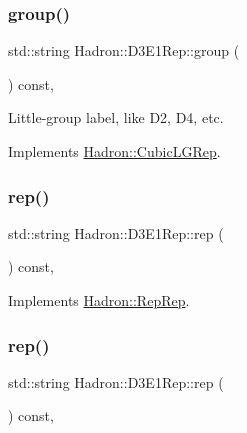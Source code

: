 \subsubsection{\texorpdfstring{group()}{group()}\hspace{0.1cm}{\footnotesize\ttfamily [3/3]}}
{\footnotesize\ttfamily std\+::string Hadron\+::\+D3\+E1\+Rep\+::group (\begin{DoxyParamCaption}{ }\end{DoxyParamCaption}) const\hspace{0.3cm}{\ttfamily [inline]}, {\ttfamily [virtual]}}

Little-\/group label, like D2, D4, etc. 

Implements \mbox{\hyperlink{structHadron_1_1CubicLGRep_a9bdb14b519a611d21379ed96a3a9eb41}{Hadron\+::\+Cubic\+L\+G\+Rep}}.

\mbox{\label{structHadron_1_1D3E1Rep_a31b989d15d93cd4e876bfabd809b84ee}} 
\subsubsection{\texorpdfstring{rep()}{rep()}\hspace{0.1cm}{\footnotesize\ttfamily [1/3]}}
{\footnotesize\ttfamily std\+::string Hadron\+::\+D3\+E1\+Rep\+::rep (\begin{DoxyParamCaption}{ }\end{DoxyParamCaption}) const\hspace{0.3cm}{\ttfamily [inline]}, {\ttfamily [virtual]}}



Implements \mbox{\hyperlink{structHadron_1_1RepRep_ab3213025f6de249f7095892109575fde}{Hadron\+::\+Rep\+Rep}}.

\mbox{\label{structHadron_1_1D3E1Rep_a31b989d15d93cd4e876bfabd809b84ee}} 
\subsubsection{\texorpdfstring{rep()}{rep()}\hspace{0.1cm}{\footnotesize\ttfamily [2/3]}}
{\footnotesize\ttfamily std\+::string Hadron\+::\+D3\+E1\+Rep\+::rep (\begin{DoxyParamCaption}{ }\end{DoxyParamCaption}) const\hspace{0.3cm}{\ttfamily [inline]}, {\ttfamily [virtual]}}



